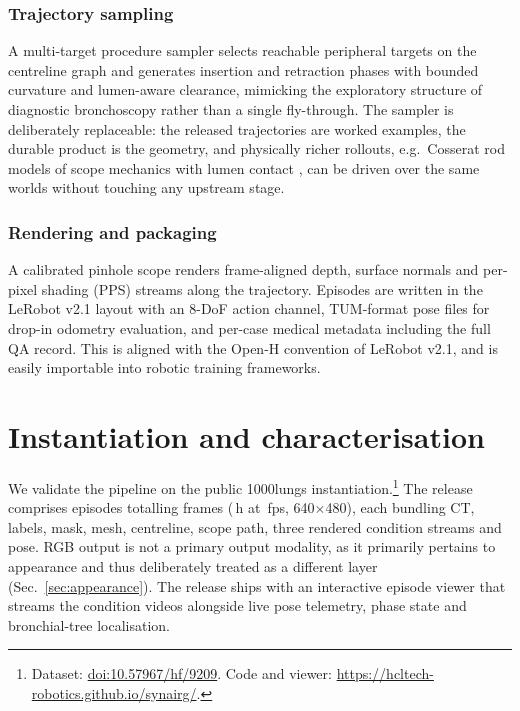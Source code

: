 \documentclass[conference]{IEEEtran}
\begin{document}
\subsubsection*{Trajectory sampling} A multi-target procedure sampler selects reachable peripheral targets on the centreline graph and generates insertion and retraction phases with bounded curvature and lumen-aware clearance, mimicking the exploratory structure of diagnostic bronchoscopy rather than a single fly-through. The sampler is deliberately replaceable: the released trajectories are worked examples, the durable product is the geometry, and physically richer rollouts, e.g.\ Cosserat rod models of scope mechanics with lumen contact \cite{rucker2011}, can be driven over the same worlds without touching any upstream stage.

\subsubsection*{Rendering and packaging} A calibrated pinhole scope renders frame-aligned depth, surface normals and per-pixel shading (PPS) streams along the trajectory. Episodes are written in the LeRobot v2.1 layout \cite{cadene2024lerobot} with an 8-DoF action channel, TUM-format pose files \cite{sturm2012tum} for drop-in odometry evaluation, and per-case medical metadata including the full QA record. This is aligned with the Open-H \cite{openh2026embodiment} convention of LeRobot v2.1, \cite{cadene2024lerobot} and is easily importable into robotic training frameworks.



\section{Instantiation and characterisation}
We validate the pipeline on the public 1000lungs instantiation.\footnote{Dataset: \href{https://doi.org/10.57967/hf/9209}{doi:10.57967/hf/9209}. Code and viewer: \url{https://hcltech-robotics.github.io/synairg/}.} The release comprises \DSepisodes{} episodes totalling \DSframestotal{} frames (\DShours{}\,h at \DSfps{}\,fps, 640$\times$480), each bundling CT, labels, mask, mesh, centreline, scope path, three rendered condition streams and pose. RGB output is not a primary output modality, as it primarily pertains to appearance and thus deliberately treated as a different layer (Sec.~\ref{sec:appearance}). The release ships with an interactive episode viewer that streams the condition videos alongside live pose telemetry, phase state and bronchial-tree localisation.
\end{document}
